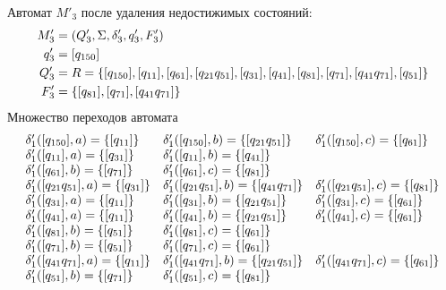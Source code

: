 Автомат \(M'_3\) после удаления недостижимых состояний:
\begin{align*}
	M'_3 & = (Q'_3, \Sigma, \delta'_3, q'_3, F'_3)                                                                                   \\
	q'_3 & = [q_{150}]                                                                                                               \\
	Q'_3 & = R = \left\{[q_{150}], [q_{11}],[q_{61}], [q_{21}q_{51}],[q_{31}], [q_{41}], [q_{81}], [q_{71}], [q_{41}q_{71}], [q_{51}]\right\} \\
	F'_3 & = \left\{ [q_{81}], [q_{71}], [q_{41}q_{71}]\right\}
\end{align*}
Множество переходов автомата
\begin{align*}
	\begin{array}{lll}
		\delta'_1([q_{150}], a) = \left\{[q_{11}]\right\}      & \delta'_1([q_{150}], b) = \left\{[q_{21}q_{51}]\right\}      & \delta'_1([q_{150}], c) = \left\{[q_{61}]\right\}      \\
		\delta'_1([q_{11}], a) = \left\{[q_{31}]\right\}       & \delta'_1([q_{11}], b) = \left\{[q_{41}]\right\}                                                             \\
		\delta'_1([q_{61}], b) = \left\{[q_{71}]\right\}       & \delta'_1([q_{61}], c) = \left\{[q_{81}]\right\}                                                             \\
		\delta'_1([q_{21}q_{51}], a) = \left\{[q_{31}]\right\} & \delta'_1([q_{21}q_{51}], b) = \left\{[q_{41}q_{71}]\right\} & \delta'_1([q_{21}q_{51}], c) = \left\{[q_{81}]\right\} \\
		\delta'_1([q_{31}], a) = \left\{[q_{11}]\right\}       & \delta'_1([q_{31}], b) = \left\{[q_{21}q_{51}]\right\}       & \delta'_1([q_{31}], c) = \left\{[q_{61}]\right\}       \\
		\delta'_1([q_{41}], a) = \left\{[q_{11}]\right\}       & \delta'_1([q_{41}], b) = \left\{[q_{21}q_{51}]\right\}       & \delta'_1([q_{41}], c) = \left\{[q_{61}]\right\}       \\
		\delta'_1([q_{81}], b) = \left\{[q_{51}]\right\}       & \delta'_1([q_{81}], c) = \left\{[q_{61}]\right\}                                                             \\
		\delta'_1([q_{71}], b) = \left\{[q_{51}]\right\}       & \delta'_1([q_{71}], c) = \left\{[q_{61}]\right\}                                                             \\
		\delta'_1([q_{41}q_{71}], a) = \left\{[q_{11}]\right\} & \delta'_1([q_{41}q_{71}], b) = \left\{[q_{21}q_{51}]\right\} & \delta'_1([q_{41}q_{71}], c) = \left\{[q_{61}]\right\} \\
		\delta'_1([q_{51}], b) = \left\{[q_{71}]\right\}       & \delta'_1([q_{51}], c) = \left\{[q_{81}]\right\}                                                             \\
	\end{array}
\end{align*}
